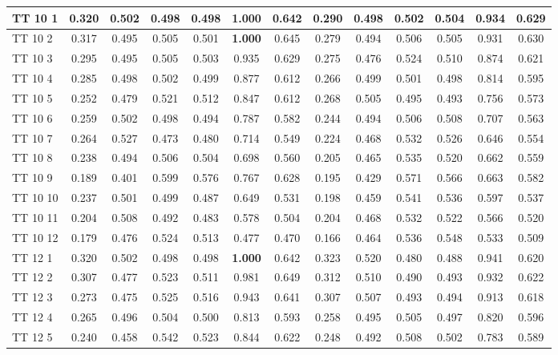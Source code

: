 \documentclass{article}
\begin{document}
\begin{tabular}{|l|c|c|c|c|c|c||c|c|c|c|c|c|}
TT 10  1 & 0.320 & 0.502 & 0.498 & 0.498 & \textbf{1.000} & 0.642 & 0.290 & 0.498 & 0.502 & 0.504 & 0.934 & 0.629\\ \hline
TT 10  2 & 0.317 & 0.495 & 0.505 & 0.501 & \textbf{1.000} & 0.645 & 0.279 & 0.494 & 0.506 & 0.505 & 0.931 & 0.630\\ \hline
TT 10  3 & 0.295 & 0.495 & 0.505 & 0.503 & 0.935 & 0.629 & 0.275 & 0.476 & 0.524 & 0.510 & 0.874 & 0.621\\ \hline
TT 10  4 & 0.285 & 0.498 & 0.502 & 0.499 & 0.877 & 0.612 & 0.266 & 0.499 & 0.501 & 0.498 & 0.814 & 0.595\\ \hline
TT 10  5 & 0.252 & 0.479 & 0.521 & 0.512 & 0.847 & 0.612 & 0.268 & 0.505 & 0.495 & 0.493 & 0.756 & 0.573\\ \hline
TT 10  6 & 0.259 & 0.502 & 0.498 & 0.494 & 0.787 & 0.582 & 0.244 & 0.494 & 0.506 & 0.508 & 0.707 & 0.563\\ \hline
TT 10  7 & 0.264 & 0.527 & 0.473 & 0.480 & 0.714 & 0.549 & 0.224 & 0.468 & 0.532 & 0.526 & 0.646 & 0.554\\ \hline
TT 10  8 & 0.238 & 0.494 & 0.506 & 0.504 & 0.698 & 0.560 & 0.205 & 0.465 & 0.535 & 0.520 & 0.662 & 0.559\\ \hline
TT 10  9 & 0.189 & 0.401 & 0.599 & 0.576 & 0.767 & 0.628 & 0.195 & 0.429 & 0.571 & 0.566 & 0.663 & 0.582\\ \hline
TT 10 10 & 0.237 & 0.501 & 0.499 & 0.487 & 0.649 & 0.531 & 0.198 & 0.459 & 0.541 & 0.536 & 0.597 & 0.537\\ \hline
TT 10 11 & 0.204 & 0.508 & 0.492 & 0.483 & 0.578 & 0.504 & 0.204 & 0.468 & 0.532 & 0.522 & 0.566 & 0.520\\ \hline
TT 10 12 & 0.179 & 0.476 & 0.524 & 0.513 & 0.477 & 0.470 & 0.166 & 0.464 & 0.536 & 0.548 & 0.533 & 0.509\\ \hline
TT 12  1 & 0.320 & 0.502 & 0.498 & 0.498 & \textbf{1.000} & 0.642 & 0.323 & 0.520 & 0.480 & 0.488 & 0.941 & 0.620\\ \hline
TT 12  2 & 0.307 & 0.477 & 0.523 & 0.511 & 0.981 & 0.649 & 0.312 & 0.510 & 0.490 & 0.493 & 0.932 & 0.622\\ \hline
TT 12  3 & 0.273 & 0.475 & 0.525 & 0.516 & 0.943 & 0.641 & 0.307 & 0.507 & 0.493 & 0.494 & 0.913 & 0.618\\ \hline
TT 12  4 & 0.265 & 0.496 & 0.504 & 0.500 & 0.813 & 0.593 & 0.258 & 0.495 & 0.505 & 0.497 & 0.820 & 0.596\\ \hline
TT 12  5 & 0.240 & 0.458 & 0.542 & 0.523 & 0.844 & 0.622 & 0.248 & 0.492 & 0.508 & 0.502 & 0.783 & 0.589\\ \hline

\end{tabular}
\end{document}
